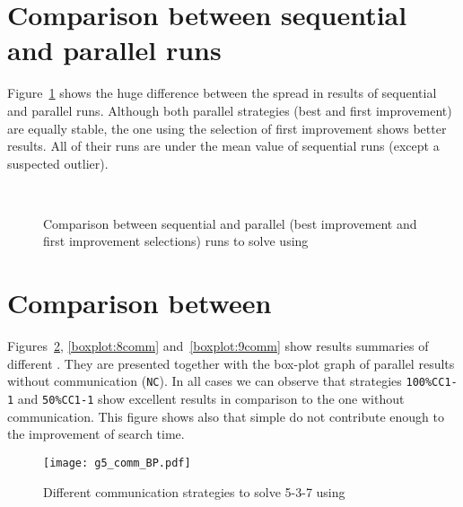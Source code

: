\section{Comparison between sequential and parallel runs}

Figure~\ref{fig:boxplot_sel} shows the huge difference between the spread in results of sequential and parallel runs. Although both parallel strategies (best and first improvement) are equally stable, the one using the selection \om{} of first improvement shows better results. All of their runs are under the mean value of sequential runs (except a suspected outlier).

\newpage

\begin{figure}[!h]
\centering
{}\hspace{0.05\linewidth}
\\
\caption[]{Comparison between sequential and parallel (best improvement and first improvement selections) runs to solve \SGP{} using \posl}
\label{fig:boxplot_sel}
\end{figure}

\section{Comparison between \commstrs}

Figures~\ref{boxplot:5comm}, \ref{boxplot:8comm} and~\ref{boxplot:9comm} show results summaries of different \commstrs{}. They are presented together with the box-plot graph of parallel results without communication (\texttt{NC}). In all cases we can observe that strategies \texttt{100\%CC1-1} and \texttt{50\%CC1-1}  show excellent results in comparison to the one without communication. This figure shows also that simple \commstrs{} do not contribute enough to the improvement of search time.

\begin{figure}[!h]
\centering
\texttt{[image: g5\_comm\_BP.pdf]}
\caption{Different communication strategies to solve \SGP{} 5-3-7 using \posl}\label{boxplot:5comm}
\end{figure}

